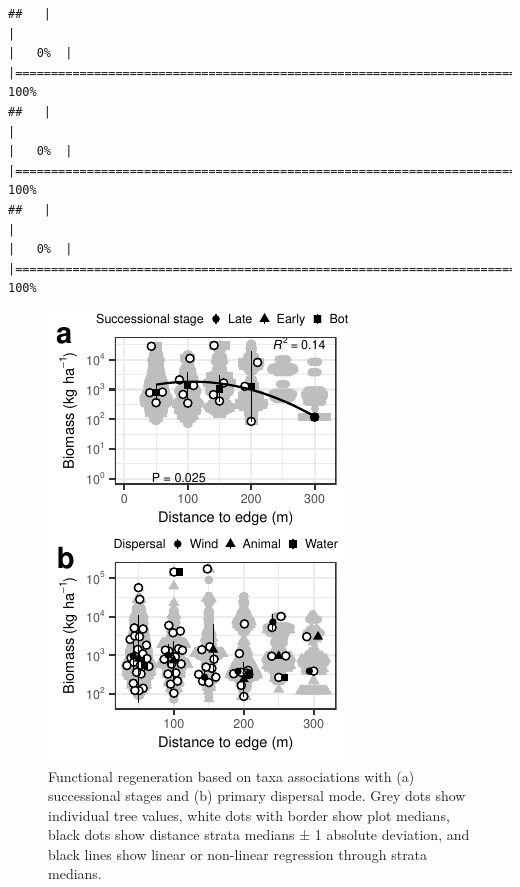 \documentclass[
  12pt,
]{article}
\begin{document}
\begin{verbatim}
##   |                                                                              |                                                                      |   0%  |                                                                              |======================================================================| 100%
##   |                                                                              |                                                                      |   0%  |                                                                              |======================================================================| 100%
##   |                                                                              |                                                                      |   0%  |                                                                              |======================================================================| 100%
\end{verbatim}

\begin{figure}
\centering
\includegraphics{merge_files/figure-latex/traits-1.pdf}
\caption{\label{fig:traits} Functional regeneration based on taxa associations with (a) successional stages and (b) primary dispersal mode. Grey dots show individual tree values, white dots with border show plot medians, black dots show distance strata medians ± 1 absolute deviation, and black lines show linear or non-linear regression through strata medians.}
\end{figure}
\end{document}

